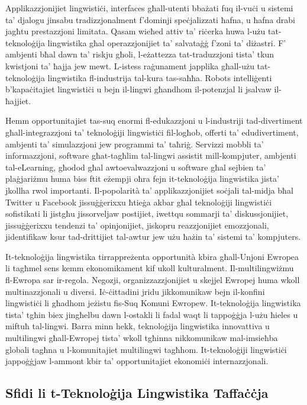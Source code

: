 \begin{multicols}{2}
Applikazzjonijiet lingwistiċi, interfaces għall-utenti bbażati fuq il-vuċi u sistemi ta’ djalogu jinsabu tradizzjonalment f’dominji speċjalizzati ħafna, u ħafna drabi jagħtu prestazzjoni limitata. Qasam wieħed attiv ta’ riċerka huwa l-użu tat-teknoloġija lingwistika għal operazzjonijiet ta’ salvataġġ f'zoni ta’ diżastri. F’ ambjenti bħal dawn ta’ riskju għoli, l-eżattezza tat-traduzzjoni tista’ tkun kwistjoni ta’ ħajja jew mewt. L-istess raġunament japplika għall-użu tat-teknoloġija lingwistika fl-industrija tal-kura tas-saħħa. Robots intelliġenti b’kapaċitajiet lingwistiċi u bejn il-lingwi għandhom il-potenzjal li jsalvaw il-ħajjiet.

Hemm opportunitajiet tas-suq enormi fl-edukazzjoni u l-industriji tad-divertiment għall-integrazzjoni ta’ teknoloġiji lingwistiċi fil-logħob, offerti ta’ edudivertiment, ambjenti ta’ simulazzjoni jew programmi ta’ taħriġ. Servizzi mobbli ta’ informazzjoni, software  għat-tagħlim tal-lingwi assistit mill-kompjuter, ambjenti tal-eLearning, għodod għal awtoevalwazzjoni u software għal sejbien ta’ plaġjariżmu huma biss ftit eżempji oħra fejn it-teknoloġija lingwistika jista’ jkollha rwol importanti. Il-popolarità ta’ applikazzjonijiet soċjali tal-midja bħal Twitter u Facebook jissuġġerixxu ħtieġa akbar għal teknoloġiji lingwistiċi sofistikati li jistgħu jissorveljaw postijiet, iwettqu sommarji ta’ diskussjonijiet, jissuġġerixxu tendenzi ta’ opinjonijiet, jiskopru reazzjonijiet emozzjonali, jidentifikaw ksur tad-drittijiet tal-awtur jew użu ħażin ta’ sistemi ta’ kompjuters.


It-teknoloġija lingwistika tirrappreżenta opportunità kbira għall-Unjoni Ewropea li tagħmel sens kemm ekonomikament kif ukoll kulturalment. Il-multilingwiżmu fl-Ewropa sar ir-regola. Negozji, organizzazzjonijiet u skejjel Ewropej huma wkoll multinazzjonali u diversi. Iċ-ċittadini jridu jikkomunikaw bejn il-konfini lingwistiċi li għadhom jeżistu fis-Suq Komuni Ewropew. It-teknoloġija lingwistika tista’ tgħin biex jingħelbu dawn l-ostakli li fadal waqt li tappoġġja l-użu ħieles u miftuħ tal-lingwi. Barra minn hekk, teknoloġija lingwistika innovattiva u multilingwi   għall-Ewropej tista’ wkoll tgħinna nikkomunikaw mal-imsieħba globali tagħna u l-komunitajiet multilingwi tagħhom. It-teknoloġiji lingwistiċi jappoġġjaw l-ammont kbir ta’ opportunitajiet ekonomiċi internazzjonali.

\subsection{Sfidi li t-Teknoloġija Lingwistika Taffaċċja}


\end{multicols}
